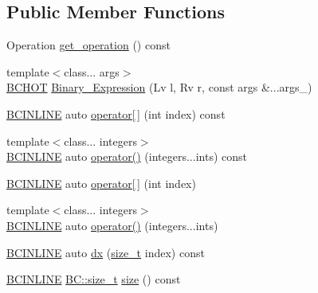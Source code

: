 \subsection*{Public Member Functions}
\begin{DoxyCompactItemize}
\item 
Operation \hyperlink{structBC_1_1tensors_1_1exprs_1_1Binary__Expression_a3e8e485a053ea1539e44f2cca9511146}{get\+\_\+operation} () const 
\item 
{\footnotesize template$<$class... args$>$ }\\\hyperlink{BlackCat__Common_8h_ac085f07cc309e3aac24aa3fc0a40f6d2}{B\+C\+H\+OT} \hyperlink{structBC_1_1tensors_1_1exprs_1_1Binary__Expression_aeddd450884ca8758d823fee84dd284b8}{Binary\+\_\+\+Expression} (Lv l, Rv r, const args \&...args\+\_\+)
\item 
\hyperlink{BlackCat__Common_8h_a6699e8b0449da5c0fafb878e59c1d4b1}{B\+C\+I\+N\+L\+I\+NE} auto \hyperlink{structBC_1_1tensors_1_1exprs_1_1Binary__Expression_a52f52e4a1d492aed4cbc5636eeacfd91}{operator\mbox{[}$\,$\mbox{]}} (int index) const 
\item 
{\footnotesize template$<$class... integers$>$ }\\\hyperlink{BlackCat__Common_8h_a6699e8b0449da5c0fafb878e59c1d4b1}{B\+C\+I\+N\+L\+I\+NE} auto \hyperlink{structBC_1_1tensors_1_1exprs_1_1Binary__Expression_a4ad48f111da0bae7d3d8abddf5517eb8}{operator()} (integers...\+ints) const 
\item 
\hyperlink{BlackCat__Common_8h_a6699e8b0449da5c0fafb878e59c1d4b1}{B\+C\+I\+N\+L\+I\+NE} auto \hyperlink{structBC_1_1tensors_1_1exprs_1_1Binary__Expression_a459a90f952d3549ed87338be1783a420}{operator\mbox{[}$\,$\mbox{]}} (int index)
\item 
{\footnotesize template$<$class... integers$>$ }\\\hyperlink{BlackCat__Common_8h_a6699e8b0449da5c0fafb878e59c1d4b1}{B\+C\+I\+N\+L\+I\+NE} auto \hyperlink{structBC_1_1tensors_1_1exprs_1_1Binary__Expression_a1880be4cfbe09a942d228f87b69822e9}{operator()} (integers...\+ints)
\item 
\hyperlink{BlackCat__Common_8h_a6699e8b0449da5c0fafb878e59c1d4b1}{B\+C\+I\+N\+L\+I\+NE} auto \hyperlink{structBC_1_1tensors_1_1exprs_1_1Binary__Expression_a1d98119a2b5fdb37b515be8210d445b2}{dx} (\hyperlink{namespaceBC_a6007cbc4eeec401a037b558910a56173}{size\+\_\+t} index) const 
\item 
\hyperlink{BlackCat__Common_8h_a6699e8b0449da5c0fafb878e59c1d4b1}{B\+C\+I\+N\+L\+I\+NE} \hyperlink{namespaceBC_a6007cbc4eeec401a037b558910a56173}{B\+C\+::size\+\_\+t} \hyperlink{structBC_1_1tensors_1_1exprs_1_1Binary__Expression_aae28d2e8eee8ebed94187556367b860b}{size} () const 

\end{DoxyCompactItemize}
